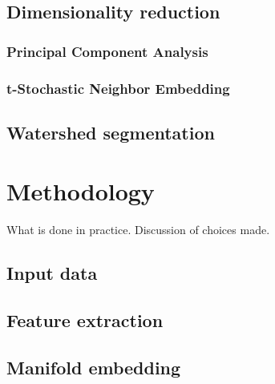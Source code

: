 \documentclass{article}
\theoremstyle{plain}
\theoremstyle{definition}
\theoremstyle{remark}
\begin{document}
\subsection{Dimensionality reduction}
\subsubsection{Principal Component Analysis}
\subsubsection{t-Stochastic Neighbor Embedding}

\subsection{Watershed segmentation}

\section{Methodology}
What is done in practice.
Discussion  of choices made.
\subsection{Input data}
\subsection{Feature extraction}
\subsection{Manifold embedding}








\newpage
\printbibliography
\end{document}
